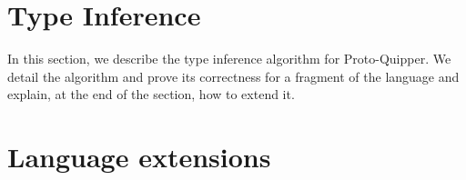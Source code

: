 \documentclass[twoside]{article}
\begin{document}
\clearpage
\section{Type Inference}

In this section, we describe the type inference algorithm 
for Proto-Quipper. We detail the algorithm and prove its 
correctness for a fragment of the language and explain, 
at the end of the section, how to extend it.




\clearpage
\section{Language extensions}
\label{sec-extensions}
\end{document}
